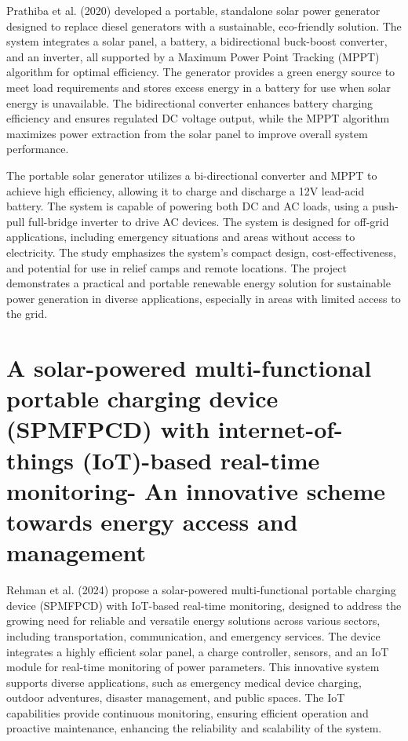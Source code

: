 {Prathiba et al. (2020) developed a portable, standalone solar power generator designed to replace diesel generators with a sustainable, eco-friendly solution. The system integrates a solar panel, a battery, a bidirectional buck-boost converter, and an inverter, all supported by a Maximum Power Point Tracking (MPPT) algorithm for optimal efficiency. The generator provides a green energy source to meet load requirements and stores excess energy in a battery for use when solar energy is unavailable. The bidirectional converter enhances battery charging efficiency and ensures regulated DC voltage output, while the MPPT algorithm maximizes power extraction from the solar panel to improve overall system performance.

The portable solar generator utilizes a bi-directional converter and MPPT to achieve high efficiency, allowing it to charge and discharge a 12V lead-acid battery. The system is capable of powering both DC and AC loads, using a push-pull full-bridge inverter to drive AC devices. The system is designed for off-grid applications, including emergency situations and areas without access to electricity. The study emphasizes the system's compact design, cost-effectiveness, and potential for use in relief camps and remote locations. The project demonstrates a practical and portable renewable energy solution for sustainable power generation in diverse applications, especially in areas with limited access to the grid.

\section{A solar-powered multi-functional portable charging device (SPMFPCD) with internet-of-things (IoT)-based real-time monitoring- An innovative scheme towards energy access and management}

Rehman et al. (2024) propose a solar-powered multi-functional portable charging device (SPMFPCD) with IoT-based real-time monitoring, designed to address the growing need for reliable and versatile energy solutions across various sectors, including transportation, communication, and emergency services. The device integrates a highly efficient solar panel, a charge controller, sensors, and an IoT module for real-time monitoring of power parameters. This innovative system supports diverse applications, such as emergency medical device charging, outdoor adventures, disaster management, and public spaces. The IoT capabilities provide continuous monitoring, ensuring efficient operation and proactive maintenance, enhancing the reliability and scalability of the system.

}
